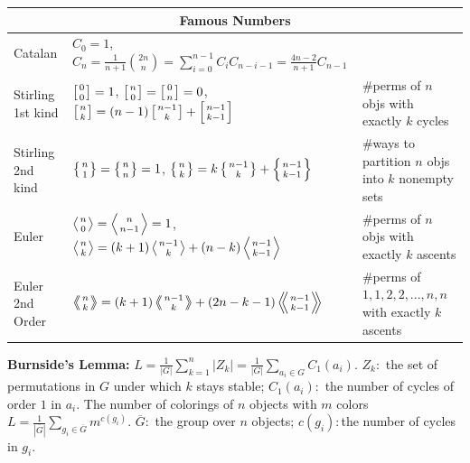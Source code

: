 \documentclass[a4paper]{article}
\begin{document}
\begin{center}
\begin{tabular}{@{}l|l|l@{}}
\toprule
\multicolumn{3}{c}{Famous Numbers} \\ \midrule

Catalan	&	$C_0=1$, $C_n=\frac{1}{n+1}\binom{2n}{n} = \sum_{i=0}^{n-1}C_iC_{n-i-1} = \frac{4n-2}{n+1}C_{n-1}$  & \\
Stirling 1st kind & $\left[{0\atop 0}\right]=1$, $\left[{n\atop 0}\right]=\left[{0\atop n}\right]=0$, $\left[{n\atop k}\right]=(n-1)\left[{n-1\atop k}\right]+\left[{n-1\atop k-1}\right]$ & \#perms of $n$ objs with exactly $k$ cycles\\
Stirling 2nd kind & $\left\{{n\atop 1}\right\}=\left\{{n\atop n}\right\}=1$, $\left\{{n\atop k}\right\} = k \left\{{ n-1 \atop k }\right\} + \left\{{n-1\atop k-1}\right\}$ & \#ways to partition $n$ objs into $k$ nonempty sets\\
Euler	& $\left \langle {n\atop 0} \right \rangle = \left \langle {n\atop n-1} \right \rangle = 1 $, $\left \langle {n\atop k} \right \rangle = (k+1) \left \langle {n-1\atop {k}} \right \rangle + (n-k)\left \langle {{n-1}\atop {k-1}} \right \rangle$ & \#perms of $n$ objs with exactly $k$ ascents \\
Euler 2nd Order &  $\left \langle \!\!\left \langle {n\atop k} \right \rangle \!\! \right \rangle = (k+1) \left \langle \!\! \left \langle {{n-1}\atop {k}} \right \rangle \!\! \right \rangle +(2n-k-1)\left \langle \!\! \left \langle {{n-1}\atop {k-1}} \right \rangle  \!\! \right \rangle$ & \#perms of ${1,1,2,2,...,n,n}$ with exactly $k$ ascents \\

\bottomrule
\end{tabular}
\end{center}


{\bf Burnside's Lemma:} $L=\frac{1}{|G|}\sum_{k=1}^n|Z_k|=\frac{1}{|G|}\sum_{a_i \in G}C_1(a_i)$. $Z_k:$ the set of permutations in $G$ under which $k$ stays stable;  $C_1(a_i):$ the number of cycles of order $1$ in $a_i$.  The number of colorings of $n$ objects with $m$ colors $L=\frac{1}{|\overline{G}|}\sum_{g_i \in \overline{G}}{m^{c(g_i)}}$. $\overline{G}:$ the group over $n$ objects;  $c(g_i):$the number of cycles in $g_i$.
\end{document}

